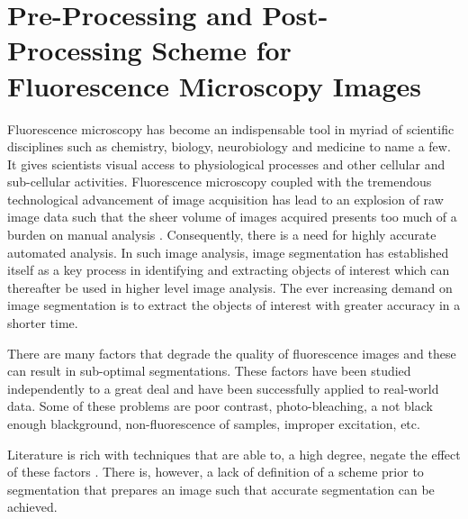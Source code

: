 
\chapter{Pre-Processing and Post-Processing Scheme for Fluorescence Microscopy Images} %

\label{chap:Chapter7} %


Fluorescence microscopy has become an indispensable tool \citep{Matula2012} in myriad of scientific disciplines such as chemistry, biology, neurobiology and medicine to name a few. It gives scientists visual access to physiological processes and other cellular and sub-cellular activities.
Fluorescence microscopy coupled with the tremendous technological advancement of image acquisition has lead to an explosion of raw image data such that the sheer volume of images acquired presents too much of a burden on manual analysis \citep{Matula2012}.
Consequently, there is a need for highly accurate automated analysis.
In such image analysis, image segmentation has established itself as a key process in identifying and extracting objects of interest which can thereafter be used in higher level image analysis.
The ever increasing demand on image segmentation is to extract the objects of interest with greater accuracy in a shorter time.

There are many factors that degrade the quality of fluorescence images and these can result in sub-optimal segmentations.
These factors have been studied independently to a great deal and have been successfully applied to real-world data.
Some of these problems are poor contrast, photo-bleaching, a not black enough blackground, non-fluorescence of samples, improper excitation, etc.

Literature is rich with techniques that are able to, a high degree, negate the effect of these factors \cite{Lysaker2004,Wang2008,Zhou2013}. There is, however, a lack of definition of a scheme prior to segmentation that prepares an image such that accurate segmentation can be achieved.

